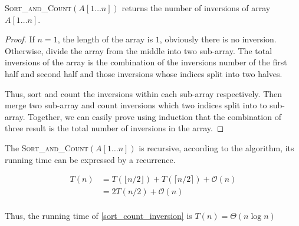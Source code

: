 \begin{homeworkProblem}[Inversions]
\Claim \textsc{Sort\_and\_Count}$(A[1 \ldots n])$ returns the number of inversions of array $A[1 \ldots n]$.

\begin{proof}
    If $n = 1$, the length of the array is $1$, obviously there is no inversion.
    Otherwise, divide the array from the middle into two sub-array. The total
    inversions of the array is the combination of the inversions number of the
    first half and second half and those inversions whose indices split into two halves.

    Thus, sort and count the inversions within each sub-array respectively. Then merge two
    sub-array and count inversions which two indices split into to sub-array.
    Together, we can easily prove using induction that the combination of
    three result is the total number of inversions in the array.
\end{proof}

The \textsc{Sort\_and\_Count}$(A[1 \ldots n])$ is recursive, according to the algorithm,
its running time can be expressed by a recurrence.

\begin{equation}
\begin{split}
    T(n) & = T(\lfloor n/2 \rfloor) + T(\lceil n/2 \rceil) + \mathcal{O}(n) \\
         & = 2T(n/2) + \mathcal{O}(n) \\
\end{split}
\end{equation}

Thus, the running time of \cref{sort_count_inversion} is $T(n) = \Theta(n \log n)$

\end{homeworkProblem}
